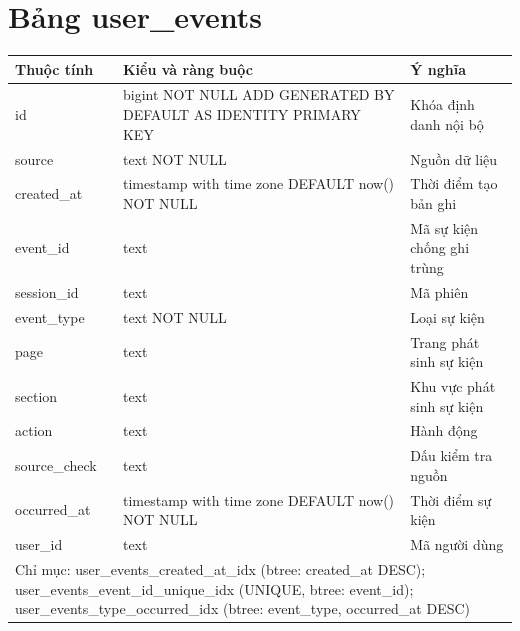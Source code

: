 \section{Bảng user\_events}
\begin{longtable}{|p{}|p{}|p{}|}\hline
\textbf{Thuộc tính}&\textbf{Kiểu và ràng buộc}&\textbf{Ý nghĩa}\\\hline\endhead
id & bigint NOT NULL ADD GENERATED BY DEFAULT AS IDENTITY PRIMARY KEY & Khóa định danh nội bộ\\\hline
source & text NOT NULL & Nguồn dữ liệu\\\hline
created\_at & timestamp with time zone DEFAULT now() NOT NULL & Thời điểm tạo bản ghi\\\hline
event\_id & text & Mã sự kiện chống ghi trùng\\\hline
session\_id & text & Mã phiên\\\hline
event\_type & text NOT NULL & Loại sự kiện\\\hline
page & text & Trang phát sinh sự kiện\\\hline
section & text & Khu vực phát sinh sự kiện\\\hline
action & text & Hành động\\\hline
source\_check & text & Dấu kiểm tra nguồn\\\hline
occurred\_at & timestamp with time zone DEFAULT now() NOT NULL & Thời điểm sự kiện\\\hline
user\_id & text & Mã người dùng\\\hline
\multicolumn{3}{|p{0.93\textwidth}|}{Chỉ mục: user\_events\_created\_at\_idx (btree: created\_at DESC); user\_events\_event\_id\_unique\_idx (UNIQUE, btree: event\_id); user\_events\_type\_occurred\_idx (btree: event\_type, occurred\_at DESC)}\\\hline
\end{longtable}
\normalsize
